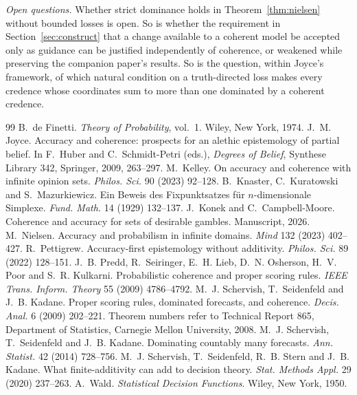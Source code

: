 \documentclass[11pt]{article}
\theoremstyle{definition}
\theoremstyle{remark}
\begin{document}
\emph{Open questions.} Whether strict dominance holds in Theorem~\ref{thm:nielsen} without bounded losses is open. So is whether the requirement in Section~\ref{sec:construct} that a change available to a coherent model be accepted only as guidance can be justified independently of coherence, or weakened while preserving the companion paper's results. So is the question, within Joyce's framework, of which natural condition on a truth-directed loss makes every credence whose coordinates sum to more than one dominated by a coherent credence.

\begin{thebibliography}{99}
 B.~de Finetti. \emph{Theory of Probability}, vol.~1. Wiley, New York, 1974.
 J.~M. Joyce. Accuracy and coherence: prospects for an alethic epistemology of partial belief. In F.~Huber and C.~Schmidt-Petri (eds.), \emph{Degrees of Belief}, Synthese Library 342, Springer, 2009, 263--297.
 M.~Kelley. On accuracy and coherence with infinite opinion sets. \emph{Philos. Sci.} 90 (2023) 92--128.
 B.~Knaster, C.~Kuratowski and S.~Mazurkiewicz. Ein Beweis des Fixpunktsatzes f\"ur $n$-dimensionale Simplexe. \emph{Fund. Math.} 14 (1929) 132--137.
 J.~Konek and C.~Campbell-Moore. Coherence and accuracy for sets of desirable gambles. Manuscript, 2026.
 M.~Nielsen. Accuracy and probabilism in infinite domains. \emph{Mind} 132 (2023) 402--427.
 R.~Pettigrew. Accuracy-first epistemology without additivity. \emph{Philos. Sci.} 89 (2022) 128--151.
 J.~B. Predd, R.~Seiringer, E.~H. Lieb, D.~N. Osherson, H.~V. Poor and S.~R. Kulkarni. Probabilistic coherence and proper scoring rules. \emph{IEEE Trans. Inform. Theory} 55 (2009) 4786--4792.
 M.~J. Schervish, T.~Seidenfeld and J.~B. Kadane. Proper scoring rules, dominated forecasts, and coherence. \emph{Decis. Anal.} 6 (2009) 202--221. Theorem numbers refer to Technical Report 865, Department of Statistics, Carnegie Mellon University, 2008.
 M.~J. Schervish, T.~Seidenfeld and J.~B. Kadane. Dominating countably many forecasts. \emph{Ann. Statist.} 42 (2014) 728--756.
 M.~J. Schervish, T.~Seidenfeld, R.~B. Stern and J.~B. Kadane. What finite-additivity can add to decision theory. \emph{Stat. Methods Appl.} 29 (2020) 237--263.
 A.~Wald. \emph{Statistical Decision Functions}. Wiley, New York, 1950.
\end{thebibliography}
\end{document}
